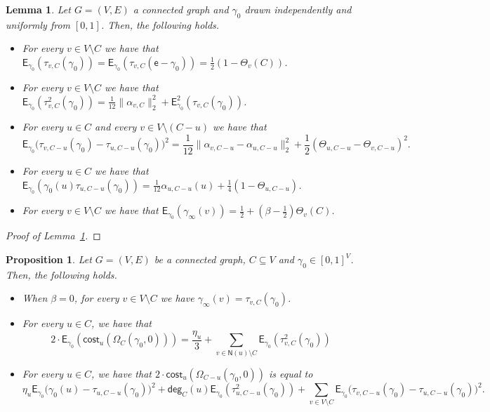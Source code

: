 \documentclass[letterpaper,11pt]{article}
\newcommand{\EE}{\mathsf{E}}
\newcommand{\nsf}{\mathsf{N}}
\newcommand{\cost}{\mathsf{cost}}
\newcommand{\degsf}{\mathsf{deg}}
\newtheorem{lemma}{Lemma}
\newtheorem{proposition}{Proposition}
\begin{document}
\begin{lemma}
\label{lem:expected-limit}
Let $G=(V,E)$ a connected graph and $\gamma_0$ drawn independently and uniformly from $[0,1]$. 
Then, the following holds.
\begin{itemize}
	\item[$(a)$] For every $v\in V\setminus C$ we have that $\EE_{\gamma_0}(\tau_{v,C}(\gamma_0))=\EE_{\gamma_0}(\tau_{v,C}(\mathsf{e}-\gamma_0))=\frac{1}{2}(1-\Theta_v(C))$.
	\item[$(b)$] For every $v\in V\setminus C$ we have that $\EE_{\gamma_0}(\tau^2_{v,C}(\gamma_0))=\frac{1}{12}\|\alpha_{v,C}\|_2^2+\EE^2_{\gamma_0}(\tau_{v,C}(\gamma_0))$.
	\item[$(c)$] For every $u\in C$ and every $v\in V\setminus (C-u)$ we have that 
	\begin{equation*}
	\EE_{\gamma_0}\Big(\tau_{v,C-u}(\gamma_0)-\tau_{u,C-u}(\gamma_0)\Big)^2=\frac{1}{12}\|\alpha_{v,C-u}-\alpha_{u,C-u}\|_2^2+\frac{1}{2}(\Theta_{u,C-u}-\Theta_{v,C-u})^2.
	\end{equation*}
	\item[$(d)$] For every $u\in C$ we have that $\EE_{\gamma_0}(\gamma_0(u)\tau_{u,C-u}(\gamma_0))=\frac{1}{12}\alpha_{u,C-u}(u)+\frac{1}{4}(1-\Theta_{u,C-u})$.
	\item[$(e)$] For every $v\in V\setminus C$ we have that $\EE_{\gamma_0}(\gamma_{\infty}(v))=\frac{1}{2}+\left(\beta-\frac{1}{2}\right)\Theta_v(C)$.
\end{itemize}
\end{lemma}

\begin{proof}[Proof of Lemma~\ref{lem:expected-limit}]

\end{proof}

\begin{proposition}
\label{prop:properties}
Let $G=(V,E)$ be a connected graph, $C\subseteq V$ and $\gamma_0\in [0,1]^V$.
Then, the following holds.
\begin{itemize}
	\item[$(a)$] When $\beta=0$, for every $v\in V\setminus C$ we have $\gamma_{\infty}(v)=\tau_{v,C}(\gamma_0)$.
	\item[$(b)$]  For every $u\in C$, we have that 
\begin{equation*}
2\cdot \EE_{\gamma_0}(\cost_u(\Omega_C(\gamma_0,0)))=\frac{\eta_u}{3}+\sum_{v\in \nsf(u)\setminus C}\EE_{\gamma_0}(\tau^2_{v,C}(\gamma_0))
\end{equation*}
	\item[$(c)$]  For every $u\in C$, we have that $2\cdot \cost_u(\Omega_{C-u}(\gamma_0,0))$ is equal to
\begin{equation*}
\eta_u\EE_{\gamma_0}\Big(\gamma_0(u)-\tau_{u,C-u}(\gamma_0)\Big)^2+\degsf_C(u)\EE_{\gamma_0}(\tau^2_{u,C-u}(\gamma_0))+\sum_{v\in V\setminus C}\EE_{\gamma_0}\Big(\tau_{v,C-u}(\gamma_0)-\tau_{u,C-u}(\gamma_0)\Big)^2.
\end{equation*}
\end{itemize}
\end{proposition}
\end{document}

